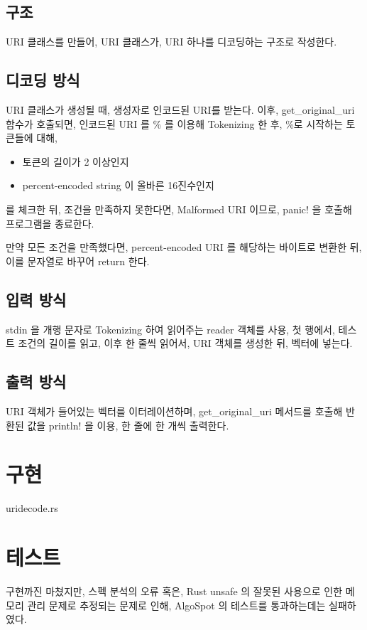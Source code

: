 \documentclass {article}
\begin{document}
\subsection {구조}
URI 클래스를 만들어, URI 클래스가, URI 하나를 디코딩하는 구조로 작성한다.
\subsection {디코딩 방식}
URI 클래스가 생성될 때, 생성자로 인코드된 URI를 받는다. 이후, get\_original\_uri
함수가 호출되면, 인코드된 URI 를 \% 를 이용해 Tokenizing 한 후, \%로 시작하는
토큰들에 대해,

\begin{itemize}
\item 토큰의 길이가 2 이상인지
\item percent-encoded string 이 올바른 16진수인지
\end{itemize}
를 체크한 뒤, 조건을 만족하지 못한다면, Malformed URI 이므로, panic!
을 호출해 프로그램을 종료한다.

만약 모든 조건을 만족했다면, percent-encoded URI 를 해당하는 바이트로
변환한 뒤, 이를 문자열로 바꾸어 return 한다.

\subsection {입력 방식}
stdin 을 개행 문자로 Tokenizing 하여 읽어주는 reader 객체를 사용,
첫 행에서, 테스트 조건의 길이를 읽고, 이후 한 줄씩 읽어서, URI 객체를
생성한 뒤, 벡터에 넣는다.

\subsection {출력 방식}
URI 객체가 들어있는 벡터를 이터레이션하며, get\_original\_uri 메서드를
호출해 반환된 값을 println! 을 이용, 한 줄에 한 개씩 출력한다.

\section {구현}
{uridecode.rs}

\section {테스트}
구현까진 마쳤지만, 스펙 분석의 오류 혹은, Rust unsafe 의 잘못된
사용으로 인한 메모리 관리 문제로 추정되는 문제로 인해, AlgoSpot 의
테스트를 통과하는데는 실패하였다.
\end{document}
